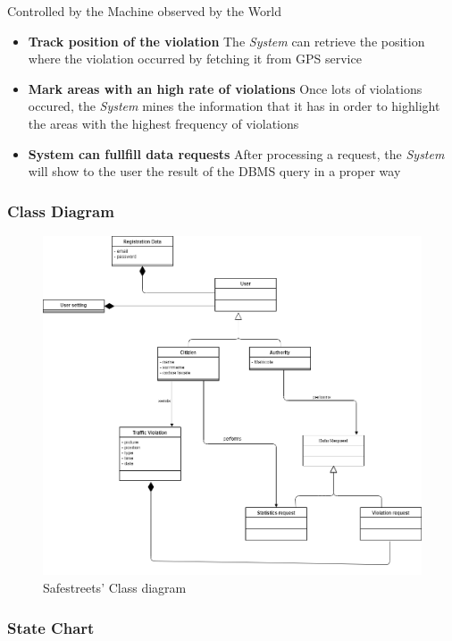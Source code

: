 \documentclass{article}
\begin{document}
Controlled by the Machine observed by the World
\begin{itemize}
    \item\textbf{Track position of the violation}
    The \textit{System} can retrieve the position where the violation occurred by fetching it from GPS service
    \item\textbf{Mark areas with an high rate of violations}
    Once lots of violations occured, the \textit{System} mines the information that it has in order to highlight the areas with the highest frequency of violations
    \item\textbf{System can fullfill data requests}
    After processing a request, the \textit{System} will show to the user the result of the DBMS query in a proper way

\end{itemize}

\subsubsection{Class Diagram} 

\begin{figure}[h!]
    \centering
    \includegraphics[scale=0.3]{img/Class_Diagram.png}
    \caption{Safestreets' Class diagram}
\end{figure}
\clearpage
\subsubsection{State Chart} 
\end{document}
